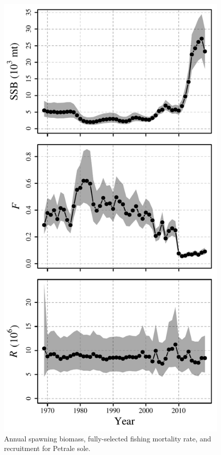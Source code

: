 \documentclass[
]{article}
\begin{document}
\begin{figure}
\caption{Annual spawning biomass, fully-selected fishing mortality rate, and recruitment for Petrale sole.}\label{SSB_F_R}
\begin{center}
\includegraphics[height = 0.8\textheight]{../results/ssm_temp/petrale_SSB_F_R.pdf}
\end{center}
\end{figure}
\end{document}
